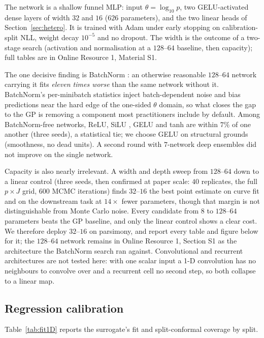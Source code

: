\documentclass[sn-basic,iicol,pdflatex]{sn-jnl}
\begin{document}
The network is a shallow funnel MLP: input $\theta=\log_{10}p$, two
GELU-activated dense layers of width $32$ and $16$ ($626$ parameters), and the
two linear heads of Section~\ref{sec:hetero}. It is trained with Adam under
early stopping on calibration-split NLL, weight decay $10^{-5}$ and no dropout.
The width is the outcome of a two-stage search (activation and normalisation at
a $128$--$64$ baseline, then capacity); full tables are in Online Resource 1,
Material S1.

The one decisive finding is BatchNorm \citep{ioffe2015}: an otherwise reasonable
$128$--$64$ network carrying it fits \emph{eleven times worse} than the same
network without it. BatchNorm's per-minibatch statistics inject batch-dependent
noise and bias predictions near the hard edge of the one-sided $\theta$ domain,
so what closes the gap to the GP is removing a component most practitioners
include by default. Among BatchNorm-free networks, ReLU, SiLU
\citep{elfwing2018}, GELU and tanh are within $7\%$ of one
another (three seeds), a statistical tie; we choose GELU on structural grounds
(smoothness, no dead units). A second round with $7$-network deep ensembles did
not improve on the single network.

Capacity is also nearly irrelevant. A width and depth sweep from $128$--$64$ down
to a linear control (three seeds, then confirmed at paper scale: $40$ replicates,
the full $p\times J$ grid, $600$ MCMC iterations) finds $32$--$16$ the best point
estimate on curve fit and on the downstream task at $14\times$ fewer parameters,
though that margin is not distinguishable from Monte Carlo noise. Every candidate
from $8$ to $128$--$64$ parameters beats the GP baseline, and only the linear
control shows a clear cost. We therefore deploy $32$--$16$ on parsimony, and
report every table and figure below for it; the $128$--$64$ network remains in
Online Resource 1, Section S1 as the architecture the BatchNorm search ran against.
Convolutional and recurrent architectures are not tested here: with one scalar
input a 1-D convolution has no neighbours to convolve over and a recurrent cell
no second step, so both collapse to a linear map.

\subsection{Regression calibration}
\label{sec:sim1D_calib}

Table~\ref{tab:fit1D} reports the surrogate's fit and split-conformal coverage
by split.
\end{document}
